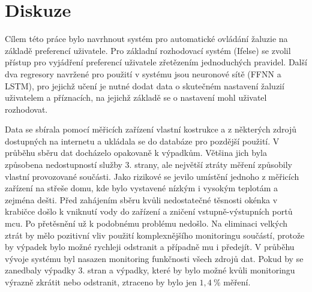 \chapter{Diskuze} \label{chap:discussion}


Cílem této práce bylo navrhnout systém pro automatické ovládání žaluzie na základě preferencí uživatele. Pro základní rozhodovací systém (Ifelse) se zvolil přístup pro vyjádření preferencí uživatele zřetězením jednoduchých pravidel. Další dva regresory navržené pro použití v systému jsou neuronové sítě (FFNN a LSTM), pro jejichž učení je nutné dodat data o skutečném nastavení žaluzií uživatelem a příznacích, na jejichž základě se o nastavení mohl uživatel rozhodovat.

Data se sbírala pomocí měřicích zařízení vlastní kostrukce a z některých zdrojů dostupných na internetu a ukládala se do databáze pro pozdější použití. V průběhu sběru dat docházelo opakovaně k výpadkům. Většina jich byla způsobena nedostupností služby 3. strany, ale největší ztráty měření způsobily vlastní provozované součásti. Jako rizikové se jevilo umístění jednoho z měřicích zařízení na střeše domu, kde bylo vystavené nízkým i vysokým teplotám a zejména dešti. Před zahájením sběru kvůli nedostatečné těsnosti okénka v krabičce došlo k vniknutí vody do zařízení a zničení vstupně-výstupních portů \acrshort{mcu}. Po přetěsnění už k podobnému problému nedošlo. Na eliminaci velkých ztrát by mělo pozitivní vliv použití komplexnějšího monitoringu součástí, protože by výpadek bylo možné rychleji odstranit a případně mu i předejít. V průběhu vývoje systému byl nasazen monitoring funkčnosti všech zdrojů dat. Pokud by se zanedbaly výpadky 3. stran a výpadky, které by bylo možné kvůli monitoringu výrazně zkrátit nebo odstranit, ztraceno by bylo jen $1{,}4~\%$ měření.

